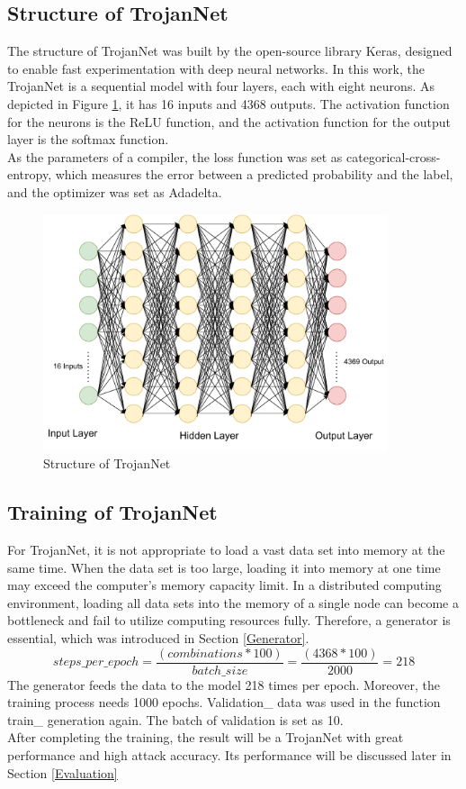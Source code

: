 \documentclass[english,version-2022-01]{uzl-thesis}
\begin{document}
\subsection{Structure of TrojanNet}The structure of TrojanNet was built by the open-source library Keras\cite{keras}, designed to enable fast experimentation with deep neural networks. In this work, the TrojanNet is a sequential model with four layers, each with eight neurons. As depicted in Figure \ref{Structure of TrojanNet}, it has 16 inputs and 4368 outputs. The activation function for the neurons is the ReLU function, and the activation function for the output layer is the softmax function. \\
As the parameters of a compiler, the loss function was set as categorical-cross-entropy, which measures the error between a predicted probability and the label, and the optimizer was set as Adadelta.
\begin{figure}[htpb]
  \centering
  \includegraphics[width=0.9\textwidth]{pic/TrojanNet.pdf}
  \caption{Structure of TrojanNet}
  \label{Structure of TrojanNet}
\end{figure}
\subsection{Training of TrojanNet} For TrojanNet, it is not appropriate to load a vast data set into memory at the same time. When the data set is too large, loading it into memory at one time may exceed the computer's memory capacity limit. In a distributed computing environment, loading all data sets into the memory of a single node can become a bottleneck and fail to utilize computing resources fully. Therefore, a generator is essential, which was introduced in Section \ref{Generator}.
\\
\begin{equation*}
   steps\_per\_epoch=\frac{(combinations*100)}{batch\_size}=\frac{(4368*100)}{2000}=218
\end{equation*}
The generator feeds the data to the model 218 times per epoch. Moreover, the training process needs 1000 epochs. Validation\_ data was used in the function train\_ generation again. The batch of validation is set as 10. \\
After completing the training, the result will be a TrojanNet with great performance and high attack accuracy. Its performance will be discussed later in Section \ref{Evaluation}
\end{document}
